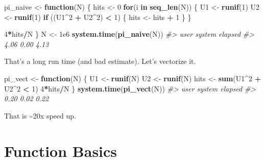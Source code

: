 \documentclass[]{book}
\newenvironment{Shaded}{\begin{snugshade}}{\end{snugshade}}
\newcommand{\KeywordTok}[1]{\textcolor[rgb]{0.13,0.29,0.53}{\textbf{#1}}}
\newcommand{\DecValTok}[1]{\textcolor[rgb]{0.00,0.00,0.81}{#1}}
\newcommand{\FloatTok}[1]{\textcolor[rgb]{0.00,0.00,0.81}{#1}}
\newcommand{\StringTok}[1]{\textcolor[rgb]{0.31,0.60,0.02}{#1}}
\newcommand{\CommentTok}[1]{\textcolor[rgb]{0.56,0.35,0.01}{\textit{#1}}}
\newcommand{\ControlFlowTok}[1]{\textcolor[rgb]{0.13,0.29,0.53}{\textbf{#1}}}
\newcommand{\OperatorTok}[1]{\textcolor[rgb]{0.81,0.36,0.00}{\textbf{#1}}}
\newcommand{\NormalTok}[1]{#1}
\theoremstyle{definition}
\theoremstyle{definition}
\theoremstyle{definition}
\theoremstyle{remark}
\begin{document}
\begin{Shaded}
\begin{Highlighting}[]
\NormalTok{pi_naive <-}\StringTok{ }\ControlFlowTok{function}\NormalTok{(N) \{}
\NormalTok{  hits <-}\StringTok{ }\DecValTok{0}
  \ControlFlowTok{for}\NormalTok{(i }\ControlFlowTok{in} \KeywordTok{seq_len}\NormalTok{(N)) \{}
\NormalTok{    U1 <-}\StringTok{ }\KeywordTok{runif}\NormalTok{(}\DecValTok{1}\NormalTok{)}
\NormalTok{    U2 <-}\StringTok{ }\KeywordTok{runif}\NormalTok{(}\DecValTok{1}\NormalTok{)}
    \ControlFlowTok{if}\NormalTok{ ((U1}\OperatorTok{^}\DecValTok{2} \OperatorTok{+}\StringTok{ }\NormalTok{U2}\OperatorTok{^}\DecValTok{2}\NormalTok{) }\OperatorTok{<}\StringTok{ }\DecValTok{1}\NormalTok{) \{}
\NormalTok{      hits <-}\StringTok{ }\NormalTok{hits }\OperatorTok{+}\StringTok{ }\DecValTok{1}
\NormalTok{    \}}
\NormalTok{  \}}
  
  \DecValTok{4}\OperatorTok{*}\NormalTok{hits}\OperatorTok{/}\NormalTok{N}
\NormalTok{\}}
\NormalTok{N <-}\StringTok{ }\FloatTok{1e6}
\KeywordTok{system.time}\NormalTok{(}\KeywordTok{pi_naive}\NormalTok{(N))}
\CommentTok{#>    user  system elapsed }
\CommentTok{#>    4.06    0.00    4.13}
\end{Highlighting}
\end{Shaded}

That's a long run time (and bad estimate). Let's vectorize it.

\begin{Shaded}
\begin{Highlighting}[]
\NormalTok{pi_vect <-}\StringTok{ }\ControlFlowTok{function}\NormalTok{(N) \{}
\NormalTok{  U1 <-}\StringTok{ }\KeywordTok{runif}\NormalTok{(N)}
\NormalTok{  U2 <-}\StringTok{ }\KeywordTok{runif}\NormalTok{(N)}
\NormalTok{  hits <-}\StringTok{ }\KeywordTok{sum}\NormalTok{(U1}\OperatorTok{^}\DecValTok{2} \OperatorTok{+}\StringTok{ }\NormalTok{U2}\OperatorTok{^}\DecValTok{2} \OperatorTok{<}\StringTok{ }\DecValTok{1}\NormalTok{)}
  \DecValTok{4}\OperatorTok{*}\NormalTok{hits}\OperatorTok{/}\NormalTok{N}
\NormalTok{\}}
\KeywordTok{system.time}\NormalTok{(}\KeywordTok{pi_vect}\NormalTok{(N))}
\CommentTok{#>    user  system elapsed }
\CommentTok{#>    0.20    0.02    0.22}
\end{Highlighting}
\end{Shaded}

That is \textasciitilde{}20x speed up.

\section{Function Basics}\label{function-basics}
\end{document}
